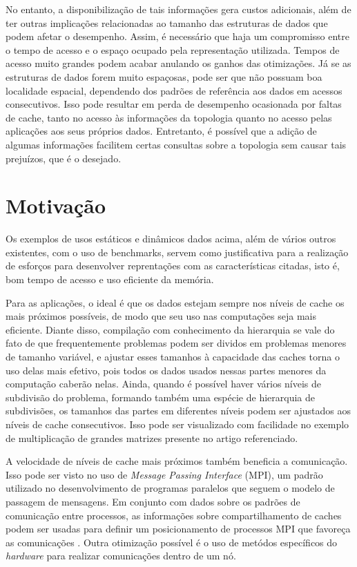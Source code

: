 
No entanto, a disponibilização de tais informações gera custos adicionais, além de ter outras implicações relacionadas ao tamanho das estruturas de dados que podem afetar o desempenho.
Assim, é necessário que haja um compromisso entre o tempo de acesso e o espaço ocupado pela representação utilizada.
Tempos de acesso muito grandes podem acabar anulando os ganhos das otimizações.
Já se as estruturas de dados forem muito espaçosas, pode ser que não possuam boa localidade espacial, dependendo dos padrões de referência aos dados em acessos consecutivos.
Isso pode resultar em perda de desempenho ocasionada por faltas de cache, tanto no acesso às informações da topologia quanto no acesso pelas aplicações aos seus próprios dados.
Entretanto, é possível que a adição de algumas informações facilitem certas consultas sobre a topologia sem causar tais prejuízos, que é o desejado.



\section{Motivação}
\label{sec:motivacao}

Os exemplos de usos estáticos e dinâmicos dados acima, além de vários outros existentes, com o uso de benchmarks, servem como justificativa para a realização de esforços para desenvolver reprentações com as características citadas, isto é, bom tempo de acesso e uso eficiente da memória.

Para as aplicações, o ideal é que os dados estejam sempre nos níveis de cache os mais próximos possíveis, de modo que seu uso nas computações seja mais eficiente.
Diante disso, compilação com conhecimento da hierarquia \cite{Sequoia} se vale do fato de que frequentemente problemas podem ser dividos em problemas menores de tamanho variável, e ajustar esses tamanhos à capacidade das caches torna o uso delas mais efetivo, pois todos os dados usados nessas partes menores da computação caberão nelas.
Ainda, quando é possível haver vários níveis de subdivisão do problema, formando também uma espécie de hierarquia de subdivisões, os tamanhos das partes em diferentes níveis podem ser ajustados aos níveis de cache consecutivos.
Isso pode ser visualizado com facilidade no exemplo de multiplicação de grandes matrizes presente no artigo referenciado.

A velocidade de níveis de cache mais próximos também beneficia a comunicação.
Isso pode ser visto no uso de \textit{Message Passing Interface} (MPI), um padrão utilizado no desenvolvimento de programas paralelos que seguem o modelo de passagem de mensagens.
Em conjunto com dados sobre os padrões de comunicação entre processos, as informações sobre compartilhamento de caches podem ser usadas para definir um posicionamento de processos MPI que favoreça as comunicações \cite{hwloc2010}.
Outra otimização possível é o uso de metódos específicos do \textit{hardware} para realizar comunicações dentro de um nó.

